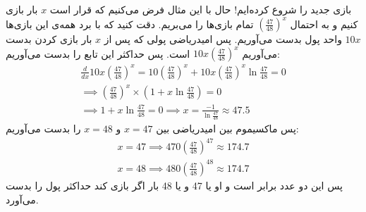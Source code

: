 بازی جدید را شروع کرده‌ایم! حال با این مثال فرض می‌کنیم که قرار است
$x$
بار بازی کنیم و به احتمال
$(\frac{47}{48})^x$
تمام بازی‌ها را می‌بریم. دقت کنید که با برد همه‌ی این بازی‌ها
$10x$
واحد پول بدست می‌آوریم. پس امیدریاضی پولی که پس از
$x$
بار بازی کردن بدست می‌آوریم
$10x(\frac{47}{48})^x$
است. پس حداکثر این تابع را بدست می‌آوریم:
\begin{gather*}
    \frac{d}{dx} 10x(\frac{47}{48})^x = 10 (\frac{47}{48})^x + 10x(\frac{47}{48})^x \ln \frac{47}{48} = 0\\
    \implies (\frac{47}{48})^x \times (1 + x \ln \frac{47}{48}) = 0\\
    \implies 1 + x \ln \frac{47}{48} = 0 \implies x = \frac{-1}{\ln \frac{47}{48}} \approx 47.5
\end{gather*}
پس ماکسیموم بین امیدریاضی بین
$x=47$
و
$x=48$
را بدست می‌آوریم:
\begin{gather*}
    x = 47 \implies 470 (\frac{47}{48})^{47} \approx 174.7\\
    x = 48 \implies 480 (\frac{47}{48})^{48} \approx 174.7
\end{gather*}
پس این دو عدد برابر است و او یا 47 و یا 48 بار اگر بازی کند حداکثر پول را بدست می‌آورد.

